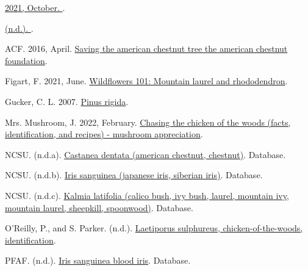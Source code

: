 \documentclass[
]{article}
\newlength{\cslhangindent}
\newlength{\cslentryspacingunit} %
\newenvironment{CSLReferences}[2] %
 {%
  \setlength{\parindent}{0pt}
  \ifodd #1
  \let\oldpar\par
  \def\par{\hangindent=\cslhangindent\oldpar}
  \fi
  \setlength{\parskip}{#2\cslentryspacingunit}
 }%
 {}
\begin{document}
\hypertarget{refs}{}
\begin{CSLReferences}{1}{0}
\leavevmode{}%
\href{https://en.wikipedia.org/w/index.php?title=Acer_\%C3\%97_freemanii\&oldid=1049718728}{2021, October. }.

\leavevmode{}%
\href{https://plants.ces.ncsu.edu/plants/gaylussacia-baccata/}{(n.d.). }.

\leavevmode{}%
ACF. 2016, April. \href{https://acf.org/}{Saving the american chestnut tree \textbar{} the american chestnut foundation}.

\leavevmode{}%
Figart, F. 2021, June. \href{https://www.smokiesinformation.org/news/wildflowers-101-mountain-laurel-and-rhododendron.html}{Wildflowers 101: Mountain laurel and rhododendron}.

\leavevmode{}%
Gucker, C. L. 2007. \href{https://www.fs.fed.us/database/feis/plants/tree/pinrig/all.html\#Cone\%20survival\%20and\%20seedling\%20establishment:}{Pinus rigida}.

\leavevmode{}%
Mrs. Mushroom, J. 2022, February. \href{https://www.mushroom-appreciation.com/chicken-of-the-woods.html}{Chasing the chicken of the woods (facts, identification, and recipes) - mushroom appreciation}.

\leavevmode{}%
NCSU. (n.d.a). \href{https://plants.ces.ncsu.edu/plants/castanea-dentata/}{Castanea dentata (american chestnut, chestnut)}. Database.

\leavevmode{}%
NCSU. (n.d.b). \href{https://plants.ces.ncsu.edu/plants/iris-sanguinea/}{Iris sanguinea (japanese iris, siberian iris)}. Database.

\leavevmode{}%
NCSU. (n.d.c). \href{https://plants.ces.ncsu.edu/plants/kalmia-latifolia/}{Kalmia latifolia (calico bush, ivy bush, laurel, mountain ivy, mountain laurel, sheepkill, spoonwood)}. Database.

\leavevmode{}%
O'Reilly, P., and S. Parker. (n.d.). \href{https://www.first-nature.com/fungi/laetiporus-sulphureus.php}{Laetiporus sulphureus, chicken-of-the-woods, identification}.

\leavevmode{}%
PFAF. (n.d.). \href{https://pfaf.org/user/Plant.aspx?LatinName=Iris+sanguinea}{Iris sanguinea blood iris}. Database.


\end{CSLReferences}
\end{document}
